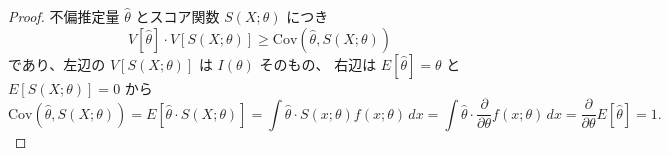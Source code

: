 \documentclass[./main.tex]{subfiles}
\begin{document}
\begin{enumerate}
        \begin{proof}
            \small
            不偏推定量 $\hat{\theta}$ とスコア関数 $S(X; \theta)$ につき
            \begin{equation}\label{eq:2024-suri-1-cauchy-schwarz}
                V[\hat{\theta}] \cdot V [S (X; \theta)]
                    \geq \mathrm{Cov} (\hat{\theta}, S(X; \theta) )
            \end{equation}
            であり、左辺の $V[S(X; \theta)]$ は $I (\theta)$ そのもの、
            右辺は $E[\hat{\theta}] = \theta$ と $E [ S(X; \theta)] = 0$ から
            \begin{equation*}
                \mathrm{Cov} (\hat{\theta}, S(X; \theta) )
                    = E[ \hat{\theta} \cdot S(X; \theta) ]
                    = \int \hat{\theta} \cdot S(x; \theta) f(x; \theta) \, dx
                    = \int \hat{\theta} \cdot \frac{\partial}{\partial \theta} f(x; \theta) \, dx
                    = \frac{\partial}{\partial \theta} E[\hat{\theta}]
                    = 1.
            \end{equation*}
        \end{proof}


\end{enumerate}
\end{document}
